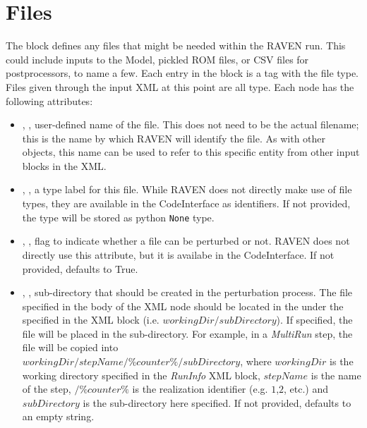 \section{Files}
\label{sec:files}

The  block defines any files that might be needed within
the RAVEN run.  This could include inputs to the Model, pickled ROM files,
or CSV files for postprocessors, to name a few.
%
Each entry in the  block is a tag with the file type.  Files
given through the input XML at this point are all  type.
Each  node has the following attributes:
\vspace{-5mm}
\begin{itemize}
  \itemsep0em
  \item {}, , user-defined name
  of the file.  This does not need to be the actual filename; this is the name
  by which RAVEN will identify the file.
  \nb As with other objects, this name can be used to refer to this
  specific entity from other input blocks in the XML.
  \item {}, , a type label
  for this file.  While RAVEN does not directly make use of file types,
  they are available in the CodeInterface as identifiers.  If not provided,
  the type will be stored as python \texttt{None} type.

  \item {}, , flag
  to indicate whether a file can be perturbed or not. RAVEN does not
  directly use this attribute, but it is availabe in the CodeInterface.
  If not provided, defaults to True.
  
  \item {}, , sub-directory
  that should be created in the perturbation process. The file specified in the body of the 
  XML node should be located in the   under the   specified
  in the  XML block (i.e. $workingDir/subDirectory$).
  If specified, the file will be
  placed in the sub-directory. For example, in a \textit{MultiRun} step, 
  the file will be copied into \\$workingDir/stepName/\%counter\%/subDirectory$, where $workingDir$
  is the working directory specified in the \textit{RunInfo} XML block, $stepName$ is the name of the step, 
  $/\%counter\%$ is the realization identifier (e.g. $1$,$2$, etc.) and $subDirectory$ is the sub-directory here
  specified.
  If not provided, defaults to an empty string.
\end{itemize}
